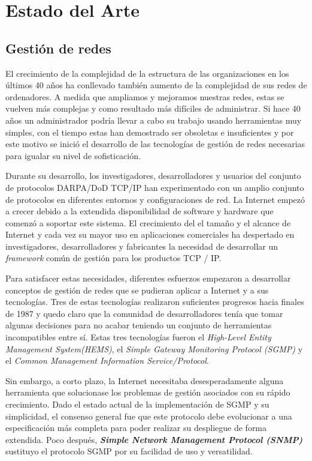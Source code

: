 \chapter{Estado del Arte\label{sec:estado_del_arte}}

\section{Gestión de redes\label{sec:gestion_redes}}
El crecimiento de la complejidad de la estructura de las organizaciones en los últimos 40 años ha 
conllevado también aumento de la complejidad de sus redes de ordenadores. A medida que ampliamos y 
mejoramos nuestras redes, estas se vuelven más complejas y como resultado más difíciles de 
administrar. Si hace 40 años un administrador podría llevar a cabo su trabajo usando herramientas 
muy simples, con el tiempo estas han demostrado ser obsoletas e insuficientes y por este motivo se 
inició el desarrollo de las tecnologías de gestión de redes necesarias para igualar su nivel de 
sofisticación.

Durante su desarrollo, los investigadores, desarrolladores y usuarios del conjunto de protocolos 
DARPA/DoD TCP/IP han experimentado con un amplio conjunto de protocolos en diferentes entornos y 
configuraciones de red. La Internet empezó a crecer debido a la extendida disponibilidad de software
y hardware que comenzó a soportar este sistema. El crecimiento del el tamaño y el alcance de Internet
y cada vez su mayor uso en aplicaciones comerciales ha despertado en investigadores, desarrolladores y
fabricantes la necesidad de desarrollar un \textit{framework} común de gestión para los productos
TCP / IP.

Para satisfacer estas necesidades, diferentes esfuerzos empezaron a desarrollar conceptos de gestión
de redes que se pudieran aplicar a Internet y a sus tecnologías. Tres de estas tecnologías realizaron
suficientes progresos hacia finales de 1987 y quedo claro que la comunidad de desarrolladores tenía que
tomar algunas decisiones para no acabar teniendo un conjunto de herramientas incompatibles entre sí.
Estas tres tecnologías fueron el \textit{High-Level Entity Management System(HEMS)}, el \textit{Simple
Gateway Monitoring Protocol (SGMP)} y el \textit{Common Management Information Service/Protocol}.

Sin embargo, a corto plazo, la Internet necesitaba desesperadamente alguna herramienta que solucionase
los problemas de gestión asociados con su rápido crecimiento. Dado el estado actual de la implementación
de SGMP y su simplicidad, el consenso general fue que este protocolo debe evolucionar a una especificación
más completa para poder realizar su despliegue de forma extendida. Poco después, \textbf{\textit{Simple 
Network Management Protocol (SNMP) }} sustituyo el protocolo SGMP por su facilidad de uso y versatilidad.

